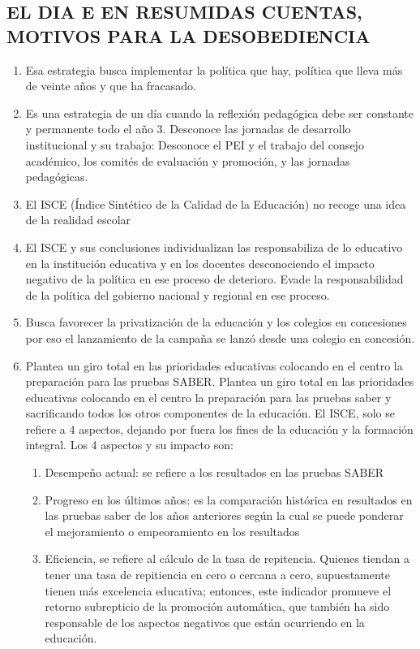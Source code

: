 \documentclass[10pt]{article}
\begin{document}
\subsection{EL DIA E EN RESUMIDAS CUENTAS, MOTIVOS PARA LA DESOBEDIENCIA}
\begin{enumerate}
\item Esa estrategia busca implementar la política que hay, política que lleva más de veinte años y que ha fracasado.
\item Es una estrategia de un día cuando la reflexión pedagógica debe ser constante y permanente todo el año
3. Desconoce las jornadas de desarrollo institucional y su trabajo: Desconoce el PEI y el trabajo del consejo académico, los comités de evaluación y promoción, y las jornadas pedagógicas.
\item El ISCE (Índice Sintético de la Calidad de la Educación) no recoge una idea de la realidad escolar
\item El ISCE y sus conclusiones individualizan las responsabiliza de lo educativo en la institución educativa y en los docentes desconociendo el impacto negativo de la política en ese proceso de deterioro. Evade la responsabilidad de la política del gobierno nacional y regional en ese proceso.
\item Busca favorecer la privatización de la educación y los colegios en concesiones por eso el lanzamiento de la campaña se lanzó desde una colegio en concesión. 
\item Plantea un giro total en las prioridades educativas colocando en el centro la preparación para las pruebas SABER. Plantea un giro total en las prioridades educativas colocando en el centro la preparación para las pruebas saber y
sacrificando todos los otros componentes de la educación. El ISCE, solo se refiere a 4 aspectos, dejando por fuera los fines de la educación y la formación integral. Los 4 aspectos y su impacto son:
\begin{enumerate}
\item Desempeño actual: se refiere a los resultados en las pruebas SABER
\item Progreso en los últimos años: es la comparación histórica en resultados en las pruebas saber de los años anteriores según la cual se puede ponderar el mejoramiento o empeoramiento en los resultados
\item Eficiencia, se refiere al cálculo de la tasa de repitencia. Quienes tiendan a tener una tasa de repitiencia en cero o cercana a cero, supuestamente tienen más excelencia educativa; entonces, este indicador promueve el retorno subrepticio de la promoción automática, que también ha sido responsable de los aspectos negativos que están ocurriendo en la educación.

\end{enumerate}
\end{enumerate}
\end{document}
